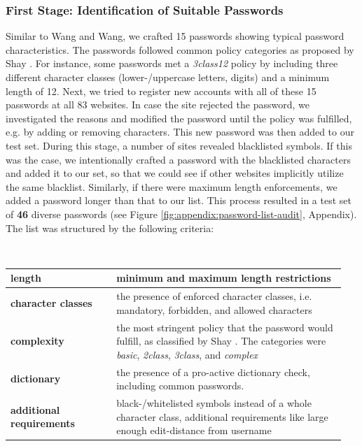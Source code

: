 \subsubsection{First Stage: Identification of Suitable Passwords} Similar to Wang and Wang, we crafted 15 passwords showing typical password characteristics. The passwords followed common policy categories as proposed by Shay \etal \cite{Shay2016DesigningPasswordPolicies}. For instance, some passwords met a \textit{3class12} policy by including three different character classes (lower-/uppercase letters, digits) and a minimum length of 12. Next, we tried to register new accounts with all of these 15 passwords at all 83 websites. In case the site rejected the password, we investigated the reasons and modified the password until the policy was fulfilled, e.g. by adding or removing characters. This new password was then added to our test set. During this stage, a number of sites revealed blacklisted symbols. If this was the case, we intentionally crafted a password with the blacklisted characters and added it to our set, so that we could see if other websites implicitly utilize the same blacklist. Similarly, if there were maximum length enforcements, we added a password longer than that to our list. This process resulted in a test set of \textbf{46} diverse passwords (see Figure \ref{fig:appendix:password-list-audit}, Appendix). The list was structured by the following criteria:\par
\noindent~\\
\noindent
\begin{tabular}{@{}p{0.3\linewidth}p{0.65\linewidth}@{}}
	\textbf{length} & minimum and maximum length restrictions\\\hline
	\textbf{character classes} & the presence of enforced character classes, i.e. mandatory, forbidden, and allowed characters\\\hline
	\textbf{complexity} & the most stringent policy that the password would fulfill, as classified by Shay \etal \cite{Shay2016DesigningPasswordPolicies}. The categories were \textit{basic}, \textit{2class}, \textit{3class}, and \textit{complex}\\\hline
	\textbf{dictionary} &  the presence of a pro-active dictionary check, including common passwords.\\\hline
	\textbf{additional requirements} &  black-/whitelisted symbols instead of a whole character class, additional requirements like large enough edit-distance from username
\end{tabular}


